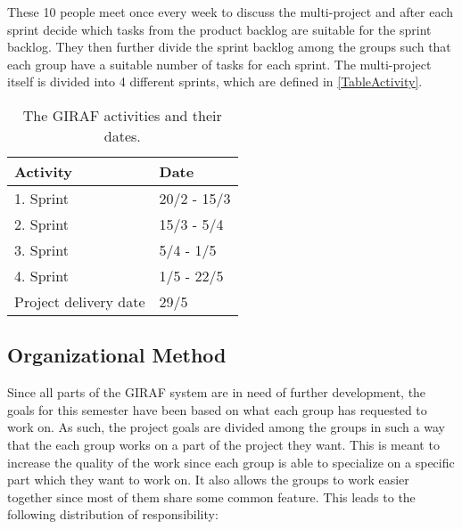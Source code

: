 
These 10 people meet once every week to discuss the multi-project and after each
sprint decide which tasks from the product backlog are suitable for the sprint
backlog. They then further divide the sprint backlog among the groups such that
each group have a suitable number of tasks for each sprint. The multi-project
itself is divided into 4 different sprints, which are defined in
\autoref{TableActivity}. 

\begin{table}[H]
\centering
\begin{tabular}{|l|l|}
\hline
Activity & Date \\ \hline
1. Sprint & 20/2 - 15/3 \\\hline 
2. Sprint & 15/3 - 5/4\\\hline 
3. Sprint & 5/4 - 1/5\\\hline 
4. Sprint & 1/5 - 22/5\\\hline 
Project delivery date & 29/5\\\hline
\end{tabular}
\caption{The GIRAF activities and their dates.}
\label{TableActivity}
\end{table}

\subsection{Organizational Method}
Since all parts of the GIRAF system are in need of further development, the
goals for this semester have been based on what each group has requested to work
on. As such, the project goals are divided among the groups in such
a way that the each group works on a part of the project they want. This is
meant to increase the quality of the work since each group is able to specialize
on a specific part which they want to work on. It also allows the groups to work
easier together since most of them share some common feature. This leads to the
following distribution of responsibility:

